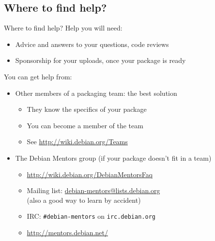 \documentclass[10pt,final]{beamer}
\begin{document}
\subsection{Where to find help?}
\begin{frame}{Where to find help?}
  Help you will need:
  \begin{itemize}
  \item Advice and answers to your questions, code reviews
  \item Sponsorship for your uploads, once your package is ready
  \end{itemize}
  \br
  You can get help from:
  \begin{itemize}
  \item Other members of a packaging team: the best solution
    \begin{itemize}
    \item They know the specifics of your package
    \item You can become a member of the team
    \item See \url{http://wiki.debian.org/Teams}
    \end{itemize}
    \hbr
  \item The Debian Mentors group (if your package doesn't fit in a team)
    \begin{itemize}
    \item \url{http://wiki.debian.org/DebianMentorsFaq}
    \item Mailing list: \url{debian-mentors@lists.debian.org}\\
	    {\small (also a good way to learn by accident)}
    \item IRC: \texttt{\#debian-mentors} on \texttt{irc.debian.org}
    \item \url{http://mentors.debian.net/}
    \end{itemize}
  \end{itemize}
\end{frame}
\end{document}
